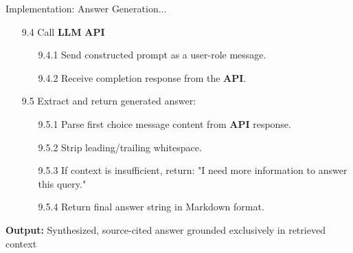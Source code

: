 \begin{frame}{Implementation: Answer Generation...}
    \begin{itemize}
        \item[9.4] Call \textbf{LLM} \textbf{API}
        \begin{itemize}
                  \item[9.4.1] Send constructed prompt as a user-role message.
                  \item[9.4.2] Receive completion response from the \textbf{API}.
        \end{itemize}

        \item[9.5] Extract and return generated answer:
        \begin{itemize}
                  \item[9.5.1] Parse first choice message content from \textbf{API} response.
                  \item[9.5.2] Strip leading/trailing whitespace.
                  \item[9.5.3] If context is insufficient, return: "I need more information to answer this query."
                  \item[9.5.4] Return final answer string in Markdown format.
                  
        \end{itemize}     
    \end{itemize}
\textbf{Output:} Synthesized, source-cited answer grounded exclusively in retrieved context
\end{frame}


